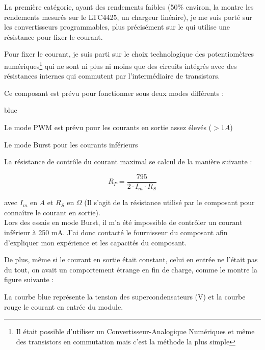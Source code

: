 La première catégorie, ayant des rendements faibles (50\% environ, la  montre les rendements mesurés sur le LTC4425, un chargeur linéaire), je me suis porté sur les convertisseurs programmables, plus précisément sur le  qui utilise une résistance pour fixer le courant. \\


Pour fixer le courant, je suis parti sur le choix technologique des potentiomètres numériques\footnote{Il était possible d'utiliser un Convertisseur-Analogique Numériques et même des transistors en commutation mais c'est la méthode la plus simple} qui ne sont ni plus ni moins que des circuits intégrés avec des résistances internes qui commutent par l'intermédiaire de transistors.

Ce composant est prévu pour fonctionner sous deux modes différents : 


\begin{items}{blue}{\Circle}
    \item Le mode PWM est prévu pour les courants en sortie assez élevés ($> 1A$)
    \item Le mode Burst pour les courants inférieurs
\end{items}


La résistance de contrôle du courant maximal se calcul de la manière suivante : 

  $$ R_{P} = \frac{795}{2\cdot I_{m}\cdot R_{S}}  $$
  
  avec $I_{m}$ en $A$ et $R_S$ en $\Omega$ (Il s'agit de la résistance  utilisé par le composant pour connaître le courant en sortie).\\
  
 
Lors des essais en mode Burst, il m'a été impossible de contrôler un courant inférieur à 250 mA. J'ai donc contacté le fournisseur du composant afin d'expliquer mon expérience et les capacités du composant.

De plus, même si le courant en sortie était constant, celui en entrée ne l'était pas du tout, on avait un comportement étrange en fin de charge, comme le montre la figure suivante : 


La courbe blue représente la tension des supercondensateurs (V) et la courbe rouge le courant en entrée du module.\\

